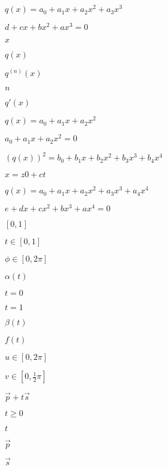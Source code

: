 \documentclass{article}
\begin{document}
$q(x) = a_0 + a_1 x + a_2 x^2 + a_3 x^3$
\pagebreak

$d + c x + b x^2 + a x^3 = 0$
\pagebreak

$x$
\pagebreak

$q(x)$
\pagebreak

$q^{(n)}(x)$
\pagebreak

$n$
\pagebreak

$q'(x)$
\pagebreak

$q(x) = a_0 + a_1 x + a_2 x^2$
\pagebreak

$a_0 + a_1 x + a_2 x^2 = 0$
\pagebreak

$(q(x))^2 = b_0 + b_1 x + b_2 x^2 + b_3 x^3 + b_4 x^4$
\pagebreak

$x = z0 + c t$
\pagebreak

$q(x) = a_0 + a_1 x + a_2 x^2 + a_3 x^3 + a_4 x^4$
\pagebreak

$e + d x + c x^2 + b x^3 + a x^4 = 0$
\pagebreak

$[ 0, 1 ]$
\pagebreak

$t \in [0, 1]$
\pagebreak

$\phi \in [0, 2 \pi]$
\pagebreak

$\alpha(t)$
\pagebreak

$t=0$
\pagebreak

$t=1$
\pagebreak

$\beta(t)$
\pagebreak

$f(t)$
\pagebreak

$u \in [0, 2\pi]$
\pagebreak

$v \in [0, \frac{1}{2} \pi]$
\pagebreak

$\vec{p} + t \vec{s}$
\pagebreak

$t \geq 0$
\pagebreak

$t$
\pagebreak

$\vec{p}$
\pagebreak

$\vec{s}$
\pagebreak
\end{document}
